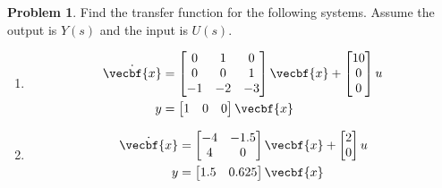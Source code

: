 \documentclass[10pt]{article}
\theoremstyle{definition}
\newtheorem{prob}{Problem}[section]
\newenvironment{subprob}%
{\renewcommand{\theenumi}{\alph{enumi}}\renewcommand{\labelenumi}{(\theenumi)}\begin{enumerate}}%
{\end{enumerate}}%
\begin{document}
\begin{prob}
    Find the transfer function for the following systems.
    Assume the output is \( Y(s) \) and the input is \( U(s) \).

    \begin{subprob}
        \item 
            \begin{align*}
                \dot{\vecbf{x}} &= 
                \begin{bmatrix} 0 & 1 & 0 \\
                    0 & 0 & 1 \\
                    -1 & -2 & -3
                \end{bmatrix} \vecbf{x} +
                \begin{bmatrix} 10 \\ 0 \\ 0\end{bmatrix} u \\
                y &= \begin{bmatrix} 1 & 0 & 0 \end{bmatrix} \vecbf{x}
            \end{align*}
        \item 
            \begin{align*}
                \dot{\vecbf{x}} &= 
                \begin{bmatrix}-4 & -1.5 \\ 4 & 0\end{bmatrix} \vecbf{x} +
                \begin{bmatrix}2 \\ 0\end{bmatrix} u \\
                y &= \begin{bmatrix}1.5 & 0.625\end{bmatrix} \vecbf{x}
            \end{align*}
    \end{subprob}
\end{prob}
\end{document}
